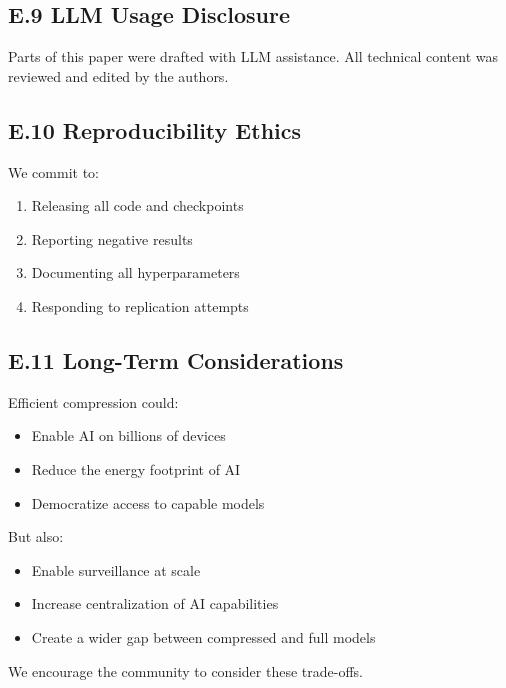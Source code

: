 \subsection{E.9 LLM Usage Disclosure}

Parts of this paper were drafted with LLM assistance. All technical content 
was reviewed and edited by the authors.

\subsection{E.10 Reproducibility Ethics}

We commit to:

\begin{enumerate}
\item Releasing all code and checkpoints
\item Reporting negative results
\item Documenting all hyperparameters
\item Responding to replication attempts

\end{enumerate}
\subsection{E.11 Long-Term Considerations}

Efficient compression could:

\begin{itemize}
\item Enable AI on billions of devices
\item Reduce the energy footprint of AI
\item Democratize access to capable models

\end{itemize}
But also:

\begin{itemize}
\item Enable surveillance at scale
\item Increase centralization of AI capabilities
\item Create a wider gap between compressed and full models

\end{itemize}
We encourage the community to consider these trade-offs.